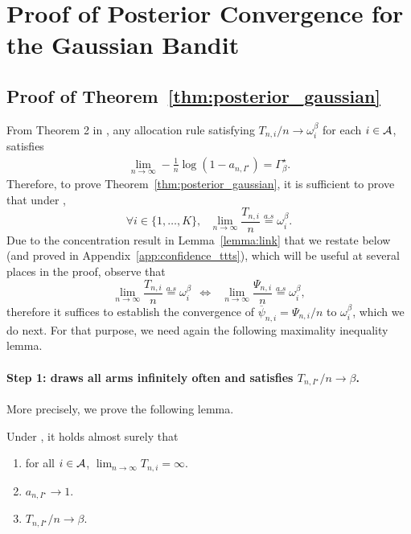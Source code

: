 \section{Proof of Posterior Convergence for the Gaussian Bandit}\label{app:posterior_gaussian}

\subsection{Proof of Theorem~\ref{thm:posterior_gaussian}}\label{app:posterior_gaussian.main}

\restateposteriorgaussian*

From Theorem 2 in \cite{qin2017ttei}, any allocation rule satisfying $T_{n, i} / n \rightarrow \omega_i^\beta$ for each $i \in \mathcal{A}$, satisfies 
\begin{align*}
    \lim_{n \rightarrow \infty} - \frac{1}{n} \log(1 - a_{n,I^\star}) = \Gamma_{\beta}^\star.
\end{align*}
Therefore, to prove Theorem~\ref{thm:posterior_gaussian}, it is sufficient to prove that under \TTTS,
\begin{equation}
    \forall i \in \{1,\dots,K\}, \ \ \     \lim_{n\rightarrow\infty} \frac{T_{n,i}}{n}  \overset{a.s}{=} \omega_i^\beta\label{ToProveGaussian}.
\end{equation}
Due to the concentration result in Lemma~\ref{lemma:link} that we restate below (and proved in Appendix~\ref{app:confidence_ttts}), which will be useful at several places in the proof, observe that 
\[
    \lim_{n\rightarrow \infty} \frac{T_{n,i}}{n}  \overset{a.s}{=} \omega_i^\beta \ \ \Leftrightarrow \ \ \ \lim_{n\rightarrow \infty} \frac{\Psi_{n,i}}{n}  \overset{a.s}{=} \omega_i^\beta,
\]
therefore it suffices to establish the convergence of $\overline{\psi}_{n,i} = \Psi_{n,i}/n$ to $\omega_i^\beta$, which we do next. For that purpose, we need again the following maximality inequality lemma.

\restatewtwo*

\paragraph{Step 1: \TTTS draws all arms infinitely often and satisfies $T_{n,I^\star}/n \rightarrow \beta$.} More precisely, we prove the following lemma. 

\begin{lemma}\label{lemma:optimal_prop_istar_gaussian}
	Under \TTTS, it holds almost surely that
	\begin{enumerate}
	    \item for all $i \in \mathcal{A}$, $\lim_{n\rightarrow \infty} T_{n,i} = \infty.$
	    \item $a_{n,I^\star} \rightarrow 1.$
	    \item $T_{n,I^\star}/n \rightarrow \beta$.
	\end{enumerate}
\end{lemma}

